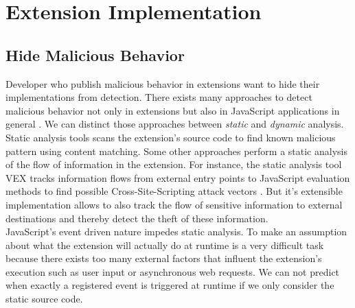 
\section{Extension Implementation} %

	\subsection{Hide Malicious Behavior} %
	
		Developer who publish malicious behavior in extensions want to hide their implementations from detection. There exists many approaches to detect malicious behavior not only in extensions but also in JavaScript applications in general \cite{184485, 190984, Bandhakavi:2011:VBE:1995376.1995398, Dhawan:2009:AIF:1723192.1723250, Hallaraker:2005:DMJ:1078029.1078861, kim2011suspicious}. We can distinct those approaches between \textit{static} and \textit{dynamic} analysis. \\
		
		Static analysis tools scans the extension's source code to find known malicious pattern using content matching. Some other approaches perform a static analysis of the flow of information in the extension. For instance, the static analysis tool VEX tracks information flows from external entry points to JavaScript evaluation methods to find possible Cross-Site-Scripting attack vectors \cite{Bandhakavi:2011:VBE:1995376.1995398}. But it's extensible implementation allows to also track the flow of sensitive information to external destinations and thereby detect the theft of these information. \\ %
		JavaScript's event driven nature impedes static analysis. To make an assumption about what the extension will actually do at runtime is a very difficult task because there exists too many external factors that influent the extension's execution such as user input or asynchronous web requests. We can not predict when exactly a registered event is triggered at runtime if we only consider the static source code. \\
		
